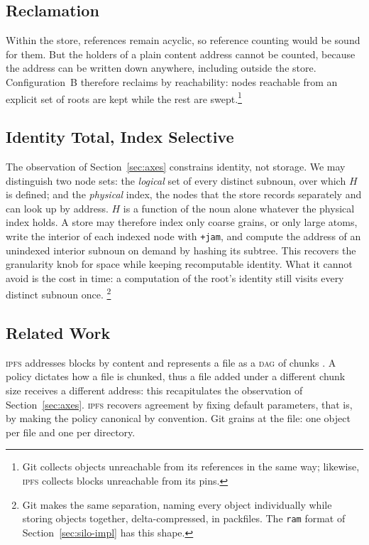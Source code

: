 \documentclass[twoside]{article}
\begin{document}
\subsection{Reclamation}

Within the store, references remain acyclic, so reference counting would be sound for them.  But the holders of a plain content address cannot be counted, because the address can be written down anywhere, including outside the store.  Configuration~B therefore reclaims by reachability:  nodes reachable from an explicit set of roots are kept while the rest are swept.\footnote{Git collects objects unreachable from its references in the same way; likewise, \textsc{ipfs} collects blocks unreachable from its pins.}

\subsection{Identity Total, Index Selective}
\label{sec:cas-index}

The observation of Section~\ref{sec:axes} constrains identity, not storage.  We may distinguish two node sets:  the \emph{logical} set of every distinct subnoun, over which $H$ is defined; and the \emph{physical} index, the nodes that the store records separately and can look up by address.  $H$ is a function of the noun alone whatever the physical index holds.  A store may therefore index only coarse grains, or only large atoms, write the interior of each indexed node with \texttt{+jam}, and compute the address of an unindexed interior subnoun on demand by hashing its subtree.  This recovers the granularity knob for space while keeping recomputable identity.  What it cannot avoid is the cost in time:  a computation of the root's identity still visits every distinct subnoun once.  
\footnote{Git makes the same separation, naming every object individually while storing objects together, delta-compressed, in packfiles.  The \texttt{ram} format of Section~\ref{sec:silo-impl} has this shape.}

\subsection{Related Work}

\textsc{ipfs} addresses blocks by content and represents a file as a \textsc{dag} of chunks \citep{Benet2014}.  A policy dictates how a file is chunked, thus a file added under a different chunk size receives a different address:  this recapitulates the observation of Section~\ref{sec:axes}.  \textsc{ipfs} recovers agreement by fixing default parameters, that is, by making the policy canonical by convention.  Git grains at the file:  one object per file and one per directory.
\end{document}
